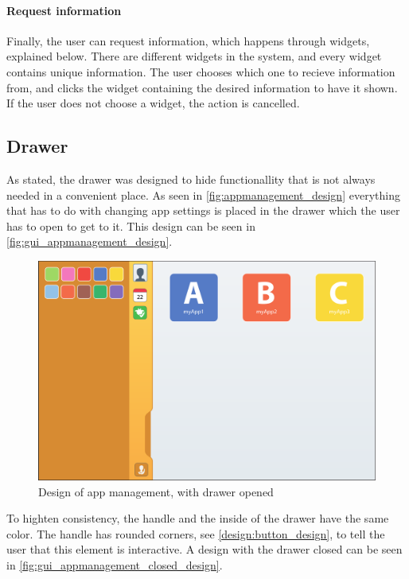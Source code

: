 \paragraph{Request information} Finally, the user can request information, which happens through widgets, explained below. 
There are different widgets in the system, and every widget contains unique information.
The user chooses which one to recieve information from, and clicks the widget containing the desired information to have it shown. 
If the user does not choose a widget, the action is cancelled. 

\subsection{Drawer}
\label{sec:drawer}
As stated, the drawer was designed to hide functionallity that is not always needed in a convenient place. 
As seen in \autoref{fig:appmanagement_design} everything that has to do with changing app settings is placed in the drawer which the user has to open to get to it.
This design can be seen in \autoref{fig:gui_appmanagement_design}.

\begin{figure}[!h]
	\centering
	\includegraphics[width=1\textwidth]{gfx/gui_appmanagement_open.pdf}
	\caption{Design of app management, with drawer opened}
	\label{fig:gui_appmanagement_design}
\end{figure}

To highten consistency, the handle and the inside of the drawer have the same color.
The handle has rounded corners, see \autoref{design:button_design}, to tell the user that this element is interactive.
A design with the drawer closed can be seen in \autoref{fig:gui_appmanagement_closed_design}.

